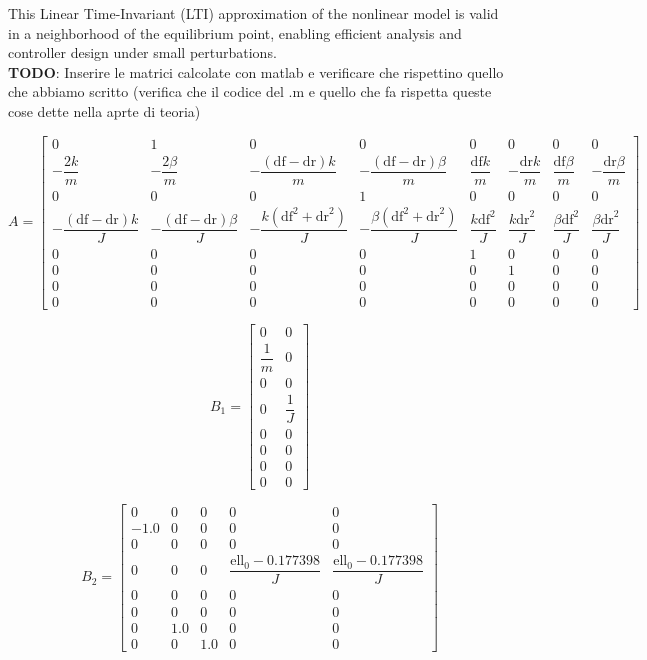 \documentclass[]{report}
\begin{document}
This Linear Time-Invariant (LTI) approximation of the nonlinear model is valid in a neighborhood of the equilibrium point, enabling efficient analysis and controller design under small perturbations.\\

 
	
		
\textbf{TODO}: Inserire le matrici calcolate con matlab e verificare che rispettino quello che abbiamo scritto (verifica che il codice del .m e quello che fa rispetta queste cose dette nella aprte di teoria)		
		
		
		
\[
A =
\begin{bmatrix}
	0 & 1 & 0 & 0 & 0 & 0 & 0 & 0 \\
	-\dfrac{2k}{m} & -\dfrac{2\beta}{m} & -\dfrac{(\mathrm{df} - \mathrm{dr})k}{m} & -\dfrac{(\mathrm{df} - \mathrm{dr})\beta}{m} & \dfrac{\mathrm{df}k}{m} & -\dfrac{\mathrm{dr}k}{m} & \dfrac{\mathrm{df}\beta}{m} & -\dfrac{\mathrm{dr}\beta}{m} \\
	0 & 0 & 0 & 1 & 0 & 0 & 0 & 0 \\
	-\dfrac{(\mathrm{df} - \mathrm{dr})k}{J} & -\dfrac{(\mathrm{df} - \mathrm{dr})\beta}{J} & -\dfrac{k(\mathrm{df}^2 + \mathrm{dr}^2)}{J} & -\dfrac{\beta(\mathrm{df}^2 + \mathrm{dr}^2)}{J} & \dfrac{k\mathrm{df}^2}{J} & \dfrac{k\mathrm{dr}^2}{J} & \dfrac{\beta\mathrm{df}^2}{J} & \dfrac{\beta\mathrm{dr}^2}{J} \\
	0 & 0 & 0 & 0 & 1 & 0 & 0 & 0 \\
	0 & 0 & 0 & 0 & 0 & 1 & 0 & 0 \\
	0 & 0 & 0 & 0 & 0 & 0 & 0 & 0 \\
	0 & 0 & 0 & 0 & 0 & 0 & 0 & 0
\end{bmatrix}
\]

\[
B_1 =
\begin{bmatrix}
	0 & 0 \\
	\dfrac{1}{m} & 0 \\
	0 & 0 \\
	0 & \dfrac{1}{J} \\
	0 & 0 \\
	0 & 0 \\
	0 & 0 \\
	0 & 0
\end{bmatrix}
\]

\[
B_2 =
\begin{bmatrix}
	0 & 0 & 0 & 0 & 0 \\
	-1.0 & 0 & 0 & 0 & 0 \\
	0 & 0 & 0 & 0 & 0 \\
	0 & 0 & 0 & \dfrac{\mathrm{ell}_0 - 0.177398}{J} & \dfrac{\mathrm{ell}_0 - 0.177398}{J} \\
	0 & 0 & 0 & 0 & 0 \\
	0 & 0 & 0 & 0 & 0 \\
	0 & 1.0 & 0 & 0 & 0 \\
	0 & 0 & 1.0 & 0 & 0
\end{bmatrix}
\]
\end{document}
